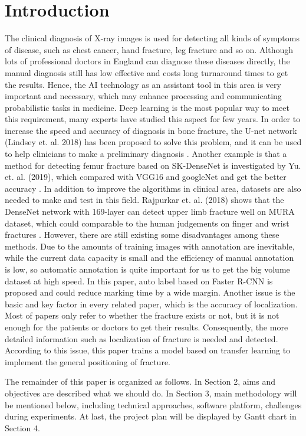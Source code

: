 \documentclass[12pt,oneside,a4paper]{article}
\begin{document}
\section{Introduction}
The clinical diagnosis of X-ray images is used for detecting all kinds of symptoms of disease, such as chest cancer, hand fracture, leg fracture and so on.  Although lots of professional doctors in England can diagnose these diseases directly, the manual diagnosis still has low effective and costs long turnaround times to get the results.  Hence, the AI technology as an assistant tool in this area is very important and necessary, which may enhance processing and communicating probabilistic tasks in medicine. Deep learning is the most popular way to meet this requirement, many experts have studied this aspect for few years. In order to increase the speed and accuracy of diagnosis in bone fracture, the U-net network (Lindsey et. al. 2018) has been proposed to solve this problem, and it can be used to help clinicians to make a preliminary diagnosis \cite{b1}. Another example is that a method for detecting femur fracture based on SK-DenseNet is investigated by Yu. et. al. (2019), which compared with VGG16 and googleNet and get the better accuracy \cite{b2}. In addition to improve the algorithms in clinical area, datasets are also needed to make and test in this field. Rajpurkar et. al. (2018) shows that the DenseNet network with 169-layer can detect upper limb fracture well on MURA dataset, which could comparable to the human judgements on finger and wrist fractures \cite{b3}. However, there are still existing some disadvantages among these methods. Due to the amounts of training images with annotation are inevitable, while the current data capacity is small and the efficiency of manual annotation is low, so automatic annotation is quite important for us to get the big volume dataset at high speed. In this paper, auto label based on Faster R-CNN \cite{b4} is proposed and could reduce marking time by a wide margin. Another issue is the basic and key factor in every related paper, which is the accuracy of localization. Most of papers only refer to whether the fracture exists or not, but it is not enough for the patients or doctors to get their results. Consequently, the more detailed information such as localization of fracture is needed and detected. According to this issue, this paper trains a model based on transfer learning to implement the general positioning of fracture.

The remainder of this paper is organized as follows. In Section 2, aims and objectives are described what we should do. In Section 3, main methodology will be mentioned below, including technical approaches, software platform, challenges during experiments. At last, the project plan will be displayed by Gantt chart in Section 4.
\end{document}
